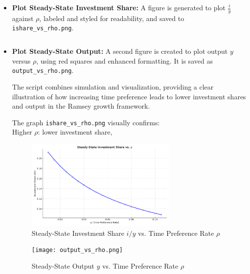 \documentclass[12pt,a4paper,notitlepage]{article}
\numberwithin{equation}{section}
\begin{document}
\begin{itemize}
\begin{itemize}
  \item \textbf{Plot Steady-State Investment Share:} A figure is generated to plot \( \frac{i}{y} \) against \( \rho \), labeled and styled for readability, and saved to \texttt{ishare\_vs\_rho.png}.
  \begin{lstlisting}
  \end{lstlisting}
  
  \item \textbf{Plot Steady-State Output:} A second figure is created to plot output \( y \) versus \( \rho \), using red squares and enhanced formatting. It is saved as \texttt{output\_vs\_rho.png}.
  

\vspace{1em}
The script combines simulation and visualization, providing a clear illustration of how increasing time preference leads to lower investment shares and output in the Ramsey growth framework.

\newpage

\bigskip
\noindent The graph \texttt{ishare\_vs\_rho.png} visually confirms:
\\ Higher \( \rho \): lower investment share,
 


\vspace{1em}

\begin{figure}[h!]
    \centering
    \includegraphics[width=0.7\textwidth]{ishare_vs_rho.png}
    \caption{Steady-State Investment Share $i/y$ vs. Time Preference Rate $\rho$}
\end{figure}

\begin{figure}[h!]
    \centering
    \texttt{[image: output\_vs\_rho.png]}
    \caption{Steady-State Output $y$ vs. Time Preference Rate $\rho$}
\end{figure}













\end{itemize}
\end{itemize}
\end{document}
